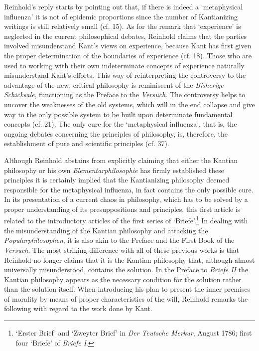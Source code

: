  Reinhold's reply starts by pointing out that, if there is indeed a `metaphysical influenza' it is not of epidemic proportions since the number of Kantianizing writings is still relatively small (cf. 15). As for the remark that `experience' is neglected in the current philosophical debates, Reinhold claims that the parties involved misunderstand Kant's views on experience, because Kant has first given the proper determination of the boundaries of experience (cf. 18). Those who are used to working with their own indeterminate concepts of experience naturally misunderstand Kant's efforts. This way of reinterpreting the controversy to the advantage of the new, critical philosophy is reminiscent of the \textit{Bisherige Schicksale}, functioning as the Preface to the \textit{Versuch}. The controversy helps to uncover the weaknesses of the old systems, which will in the end collapse and give way to the only possible system to be built upon determinate fundamental concepts (cf. 21). The only cure for the `metaphysical influenza', that is, the ongoing debates concerning the principles of philosophy, is, therefore, the establishment of pure and scientific principles (cf. 37). 

 Although Reinhold abstains from explicitly claiming that either the Kantian philosophy or his own \textit{Elementarphilosophie} has firmly established these principles it is certainly implied that the Kantianizing philosophy deemed responsible for the metaphysical influenza, in fact contains the only possible cure. In its presentation of a current chaos in philosophy, which has to be solved by a proper understanding of its presuppositions and principles, this first article is related to the introductory articles of the first series of `Briefe'.\footnote{ `Erster Brief' and `Zweyter Brief' in \textit{Der Teutsche Merkur}, August 1786; first four `Briefe' of \textit{Briefe I}. } In dealing with the misunderstanding of the Kantian philosophy and attacking the \textit{Popularphilosophen}, it is also akin to the Preface and the First Book of the \textit{Versuch}. The most striking difference with all of these previous works is that Reinhold no longer claims that it is the Kantian philosophy that, although almost universally misunderstood, contains the solution. In the Preface to \textit{Briefe II }the Kantian philosophy appears as the necessary condition for the solution rather than the solution itself. When introducing his plan to present the inner premises of morality by means of proper characteristics of the will, Reinhold remarks the following with regard to the work done by Kant. 

